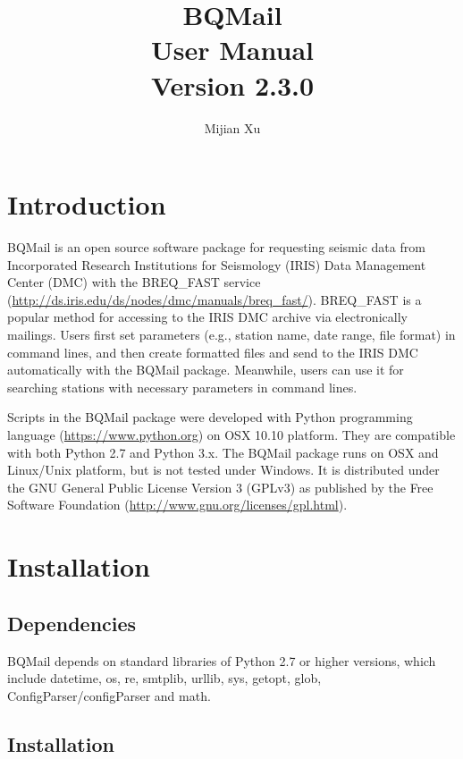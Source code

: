 \documentclass[12pt, a4paper]{report}
\title{BQMail\\User Manual\\Version 2.3.0}
\author[1,*]{Mijian Xu}
\affil[1]{\small School of Earth Science and Engineering, Nanjing University}
\affil[*]{\small Email: gomijianxu@gmail.com}
\begin{document}
\maketitle
\tableofcontents
\chapter{Introduction}

BQMail is an open source software package for requesting seismic data from Incorporated Research Institutions for Seismology (IRIS) Data Management Center (DMC) with the BREQ\_FAST service (\url{http://ds.iris.edu/ds/nodes/dmc/manuals/breq_fast/}). BREQ\_FAST is a popular method for accessing to the IRIS DMC archive via electronically mailings. Users first set parameters (e.g., station name, date range, file format) in command lines, and then create formatted files and send to the IRIS DMC automatically with the BQMail package. Meanwhile, users can use it for searching stations with necessary parameters in command lines.

Scripts in the BQMail package were developed with Python programming language (\url{https://www.python.org}) on OSX 10.10 platform. They are compatible with both Python 2.7 and Python 3.x. The BQMail package runs on OSX and Linux/Unix platform, but is not tested under Windows. It is distributed under the GNU General Public License Version 3 (GPLv3) as published by the Free Software Foundation (\url{http://www.gnu.org/licenses/gpl.html}).

\chapter{Installation}

\section{Dependencies}
BQMail depends on standard libraries of Python 2.7 or higher versions, which include datetime, os, re, smtplib, urllib, sys, getopt, glob, ConfigParser/configParser and math.

\section{Installation}
\end{document}

